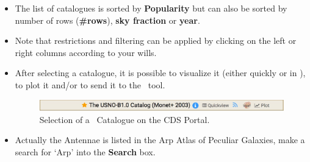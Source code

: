 \documentclass [a4paper, 12pt]{article}
\begin{document}
\begin{itemize}
\item The list of catalogues is sorted by \textbf{Popularity} but can
also be sorted by number of rows (\textbf{\#rows}), \textbf{sky
fraction} or \textbf{year}.
\item Note that restrictions and filtering can be applied by clicking
on the left or right columns according to your wills.
\item After selecting a catalogue, it is possible to visualize it (either
quickly or in \vizier), to plot it and/or to send it to the \aladin\
tool.
\begin{figure}[H]
\center
\includegraphics[width=1  \textwidth]{../images/cdsportal_table_usno.jpg}
\caption{Selection of a \vizier\ Catalogue on the CDS Portal.}
\label{fig:cdsportal5}
\end{figure}
\item Actually the Antennae is listed in the Arp Atlas of Peculiar
Galaxies, make a search for `Arp' into the \textbf{Search} box.


\end{itemize}
\end{document}
